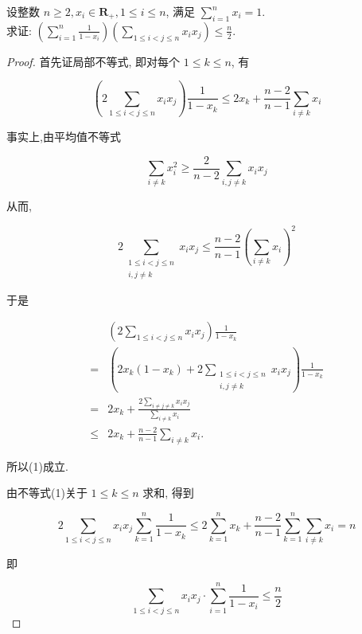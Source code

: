 \begin{example}
	设整数 $n \geqslant 2, x_{i} \in \mathbf{R}_{+}, 1 \leqslant i \leqslant n$, 满足 $\sum_{i=1}^{n} x_{i}=1$.\\
	求证: $\left(\sum_{i=1}^{n} \frac{1}{1-x_{i}}\right)\left(\sum_{1 \leqslant i<j \leqslant n} x_{i} x_{j}\right) \leqslant \frac{n}{2}$.
\end{example}
\begin{proof}
	首先证局部不等式, 即对每个 $1 \leqslant k \leqslant n$, 有
	
	
	\begin{equation*}
	\left(2 \sum_{1 \leqslant i<j \leqslant n} x_{i} x_{j}\right) \frac{1}{1-x_{k}} \leqslant 2 x_{k}+\frac{n-2}{n-1} \sum_{i \neq k} x_{i} \tag{1}
	\end{equation*}
	
	
	事实上,由平均值不等式
	
	$$
	\sum_{i \neq k} x_{i}^{2} \geqslant \frac{2}{n-2} \sum_{i, j \neq k} x_{i} x_{j}
	$$
	
	从而,
	
	$$
	2 \sum_{\substack{1 \leqslant i<j \leqslant n \\ i, j \neq k}} x_{i} x_{j} \leqslant \frac{n-2}{n-1}\left(\sum_{i \neq k} x_{i}\right)^{2}
	$$
	
	于是
	
	$$
	\begin{aligned}
	& \left(2 \sum_{1 \leqslant i<j \leqslant n} x_{i} x_{j}\right) \frac{1}{1-x_{k}} \\
	= & \left(2 x_{k}\left(1-x_{k}\right)+2 \sum_{\substack{1 \leqslant i<j \leqslant n \\
	i, j \neq k}} x_{i} x_{j}\right) \frac{1}{1-x_{k}} \\
	= & 2 x_{k}+\frac{2 \sum_{i \neq j \neq k} x_{i} x_{j}}{\sum_{i \neq k} x_{i}} \\
	\leqslant & 2 x_{k}+\frac{n-2}{n-1} \sum_{i \neq k} x_{i} .
	\end{aligned}
	$$
	
	所以(1)成立.
	
	由不等式(1)关于 $1 \leqslant k \leqslant n$ 求和, 得到
	
	$$
	2 \sum_{1 \leqslant i<j \leqslant n} x_{i} x_{j} \sum_{k=1}^{n} \frac{1}{1-x_{k}} \leqslant 2 \sum_{k=1}^{n} x_{k}+\frac{n-2}{n-1} \sum_{k=1}^{n} \sum_{i \neq k} x_{i}=n
	$$
	
	即
	
	$$
	\sum_{1 \leqslant i<j \leqslant n} x_{i} x_{j} \cdot \sum_{i=1}^{n} \frac{1}{1-x_{i}} \leqslant \frac{n}{2}
	$$
	

\end{proof}
